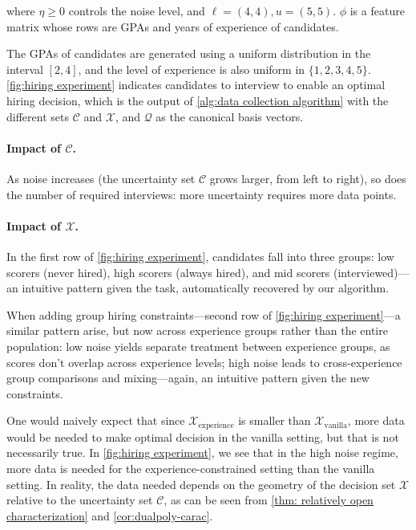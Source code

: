 \documentclass[11pt]{article}
\theoremstyle{plain}
\theoremstyle{definition}
\newcommand{\cQ}{\mathcal Q}
\newcommand{\cX}{\mathcal{X}}
\newcommand{\cC}{\mathcal{C}}
\begin{document}
where $\eta \geq 0$ controls the noise level, and $\ell=(4,4), u =(5,5)$. $\phi$ is a feature matrix whose rows are GPAs and years of experience of candidates. 

The GPAs of candidates are generated using a uniform distribution in the interval $[2,4]$, and the level of experience is also uniform in $\{1,2,3,4,5\}$. 
\cref{fig:hiring experiment} indicates candidates to interview to enable an optimal hiring decision, which is the output of \cref{alg:data collection algorithm} with the different sets $\cC$ and $\cX$, and $\cQ$ as the canonical basis vectors.

\paragraph{Impact of $\cC$.} As noise increases (the uncertainty set $\cC$ grows larger, from left to right), so does the number of required interviews: more uncertainty requires more data points. 

\paragraph{Impact of $\cX$.} In the first row of \cref{fig:hiring experiment}, candidates fall into three groups: low scorers (never hired), high scorers (always hired), and mid scorers (interviewed)---an intuitive pattern given the task, automatically recovered by our algorithm. 

When adding group hiring constraints---second row of \cref{fig:hiring experiment}---a similar pattern arise, but now across experience groups rather than the entire population: low noise yields separate treatment between experience groups, as scores don’t overlap across experience levels; high noise leads to cross-experience group comparisons and mixing---again, an intuitive pattern given the new constraints. 

One would naively expect that since $\cX_{\text{experience}}$ is smaller than $\cX_{\text{vanilla}}$, more data would be needed to make optimal decision in the vanilla setting, but that is not necessarily true. In \cref{fig:hiring experiment}, we see that in the high noise regime, more data is needed for the experience-constrained setting than the vanilla setting. In reality, the data needed depends on the geometry of the decision set $\cX$ relative to the uncertainty set $\cC$, as can be seen from \cref{thm: relatively open characterization} and \cref{cor:dualpoly-carac}.
\end{document}
